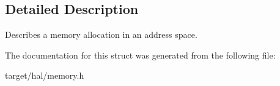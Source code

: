 \subsection{Detailed Description}
Describes a memory allocation in an address space. 

The documentation for this struct was generated from the following file\+:\begin{DoxyCompactItemize}
\item 
target/hal/memory.\+h\end{DoxyCompactItemize}
